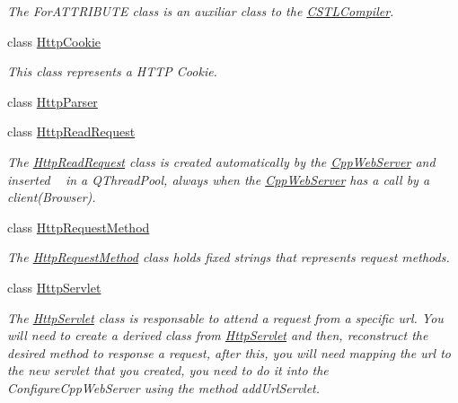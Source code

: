 \begin{DoxyCompactItemize}
\begin{DoxyCompactList}\small\item\em The For\+A\+T\+T\+R\+I\+B\+U\+T\+E class is an auxiliar class to the \hyperlink{class_c_w_f_1_1_c_s_t_l_compiler}{C\+S\+T\+L\+Compiler}. \end{DoxyCompactList}\item 
class \hyperlink{class_c_w_f_1_1_http_cookie}{Http\+Cookie}
\begin{DoxyCompactList}\small\item\em This class represents a H\+T\+T\+P Cookie. \end{DoxyCompactList}\item 
class \hyperlink{class_c_w_f_1_1_http_parser}{Http\+Parser}
\item 
class \hyperlink{class_c_w_f_1_1_http_read_request}{Http\+Read\+Request}
\begin{DoxyCompactList}\small\item\em The \hyperlink{class_c_w_f_1_1_http_read_request}{Http\+Read\+Request} class is created automatically by the \hyperlink{class_c_w_f_1_1_cpp_web_server}{Cpp\+Web\+Server} and inserted ~\newline
 in a Q\+Thread\+Pool, always when the \hyperlink{class_c_w_f_1_1_cpp_web_server}{Cpp\+Web\+Server} has a call by a client(\+Browser). \end{DoxyCompactList}\item 
class \hyperlink{class_c_w_f_1_1_http_request_method}{Http\+Request\+Method}
\begin{DoxyCompactList}\small\item\em The \hyperlink{class_c_w_f_1_1_http_request_method}{Http\+Request\+Method} class holds fixed strings that represents request methods. \end{DoxyCompactList}\item 
class \hyperlink{class_c_w_f_1_1_http_servlet}{Http\+Servlet}
\begin{DoxyCompactList}\small\item\em The \hyperlink{class_c_w_f_1_1_http_servlet}{Http\+Servlet} class is responsable to attend a request from a specific url. You will need to create a derived class from \hyperlink{class_c_w_f_1_1_http_servlet}{Http\+Servlet} and then, reconstruct the desired method to response a request, after this, you will need mapping the url to the new servlet that you created, you need to do it into the Configure\+Cpp\+Web\+Server using the method add\+Url\+Servlet. \end{DoxyCompactList}\item 

\end{DoxyCompactItemize}
